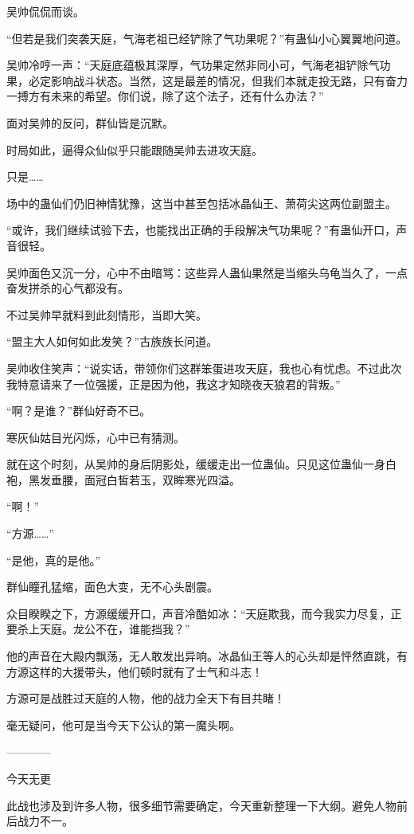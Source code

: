 \begin{this_body}
吴帅侃侃而谈。

“但若是我们突袭天庭，气海老祖已经铲除了气功果呢？”有蛊仙小心翼翼地问道。

吴帅冷哼一声：“天庭底蕴极其深厚，气功果定然非同小可，气海老祖铲除气功果，必定影响战斗状态。当然，这是最差的情况，但我们本就走投无路，只有奋力一搏方有未来的希望。你们说，除了这个法子，还有什么办法？”

面对吴帅的反问，群仙皆是沉默。

时局如此，逼得众仙似乎只能跟随吴帅去进攻天庭。

只是……

场中的蛊仙们仍旧神情犹豫，这当中甚至包括冰晶仙王、萧荷尖这两位副盟主。

“或许，我们继续试验下去，也能找出正确的手段解决气功果呢？”有蛊仙开口，声音很轻。

吴帅面色又沉一分，心中不由暗骂：这些异人蛊仙果然是当缩头乌龟当久了，一点奋发拼杀的心气都没有。

不过吴帅早就料到此刻情形，当即大笑。

“盟主大人如何如此发笑？”古族族长问道。

吴帅收住笑声：“说实话，带领你们这群笨蛋进攻天庭，我也心有忧虑。不过此次我特意请来了一位强援，正是因为他，我这才知晓夜天狼君的背叛。”

“啊？是谁？”群仙好奇不已。

寒灰仙姑目光闪烁，心中已有猜测。

就在这个时刻，从吴帅的身后阴影处，缓缓走出一位蛊仙。只见这位蛊仙一身白袍，黑发垂腰，面冠白皙若玉，双眸寒光四溢。

“啊！”

“方源……”

“是他，真的是他。”

群仙瞳孔猛缩，面色大变，无不心头剧震。

众目睽睽之下，方源缓缓开口，声音冷酷如冰：“天庭欺我，而今我实力尽复，正要杀上天庭。龙公不在，谁能挡我？”

他的声音在大殿内飘荡，无人敢发出异响。冰晶仙王等人的心头却是怦然直跳，有方源这样的大援带头，他们顿时就有了士气和斗志！

方源可是战胜过天庭的人物，他的战力全天下有目共睹！

毫无疑问，他可是当今天下公认的第一魔头啊。

------------

今天无更

此战也涉及到许多人物，很多细节需要确定，今天重新整理一下大纲。避免人物前后战力不一。

\end{this_body}

